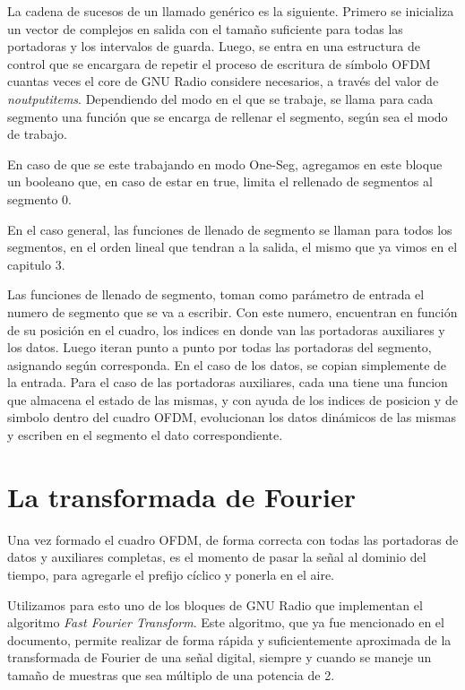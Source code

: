 La cadena de sucesos de un llamado genérico es la siguiente. Primero se inicializa un vector de complejos en salida con el tamaño suficiente para todas las portadoras y los intervalos de guarda. Luego, se entra en una estructura de control que se encargara de  repetir el proceso de escritura de símbolo OFDM cuantas veces el core de GNU Radio considere necesarios, a través del valor de \textit{noutputitems}. Dependiendo del modo en el que se trabaje, se llama para cada segmento una función que se encarga de rellenar el segmento, según sea el modo de trabajo.

En caso de que se este trabajando en modo One-Seg, agregamos en este bloque un booleano que, en caso de estar en true, limita el rellenado de segmentos al segmento 0. 

En el caso general, las funciones de llenado de segmento se llaman para todos los segmentos, en el orden lineal que tendran a la salida, el mismo que ya vimos en el capitulo 3.

Las funciones de llenado de segmento, toman como parámetro de entrada el numero de segmento que se va a escribir. Con este numero, encuentran en función de su posición en el cuadro, los indices en donde van las portadoras auxiliares y los datos. Luego iteran punto a punto por todas las portadoras del segmento, asignando según corresponda. En el caso de los datos, se copian simplemente de la entrada. Para el caso de las portadoras auxiliares, cada una tiene una funcion que almacena el estado de las mismas, y con ayuda de los indices de posicion y de simbolo dentro del cuadro OFDM, evolucionan los datos dinámicos de las mismas y escriben en el segmento el dato correspondiente. 
	
\section{La transformada de Fourier}

Una vez formado el cuadro OFDM, de forma correcta con todas las portadoras de datos y auxiliares completas, es el momento de pasar la señal al dominio del tiempo, para agregarle el prefijo cíclico y ponerla en el aire. 

Utilizamos para esto uno de los bloques de GNU Radio que implementan el algoritmo \textit{Fast Fourier Transform}. Este algoritmo, que ya fue mencionado en el documento, permite realizar de forma rápida y suficientemente aproximada de la transformada de Fourier de una señal digital, siempre y cuando se maneje un tamaño de muestras que sea múltiplo de una potencia de 2.

